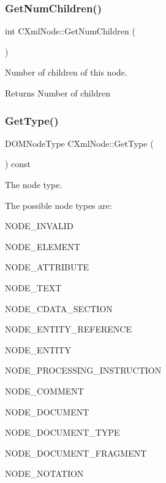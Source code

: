 \subsubsection{\texorpdfstring{Get\+Num\+Children()}{GetNumChildren()}}
{\footnotesize\ttfamily int C\+Xml\+Node\+::\+Get\+Num\+Children (\begin{DoxyParamCaption}{ }\end{DoxyParamCaption})}



Number of children of this node. 

\begin{DoxyReturn}{Returns}
Number of children 
\end{DoxyReturn}
\mbox{\label{classxmlnode_1_1_c_xml_node_ac6a20070f4679d4b7e4e69b844692214}} 
\subsubsection{\texorpdfstring{Get\+Type()}{GetType()}}
{\footnotesize\ttfamily D\+O\+M\+Node\+Type C\+Xml\+Node\+::\+Get\+Type (\begin{DoxyParamCaption}{ }\end{DoxyParamCaption}) const}



The node type. 

The possible node types are\+:
\begin{DoxyItemize}
\item N\+O\+D\+E\+\_\+\+I\+N\+V\+A\+L\+ID
\item N\+O\+D\+E\+\_\+\+E\+L\+E\+M\+E\+NT
\item N\+O\+D\+E\+\_\+\+A\+T\+T\+R\+I\+B\+U\+TE
\item N\+O\+D\+E\+\_\+\+T\+E\+XT
\item N\+O\+D\+E\+\_\+\+C\+D\+A\+T\+A\+\_\+\+S\+E\+C\+T\+I\+ON
\item N\+O\+D\+E\+\_\+\+E\+N\+T\+I\+T\+Y\+\_\+\+R\+E\+F\+E\+R\+E\+N\+CE
\item N\+O\+D\+E\+\_\+\+E\+N\+T\+I\+TY
\item N\+O\+D\+E\+\_\+\+P\+R\+O\+C\+E\+S\+S\+I\+N\+G\+\_\+\+I\+N\+S\+T\+R\+U\+C\+T\+I\+ON
\item N\+O\+D\+E\+\_\+\+C\+O\+M\+M\+E\+NT
\item N\+O\+D\+E\+\_\+\+D\+O\+C\+U\+M\+E\+NT
\item N\+O\+D\+E\+\_\+\+D\+O\+C\+U\+M\+E\+N\+T\+\_\+\+T\+Y\+PE
\item N\+O\+D\+E\+\_\+\+D\+O\+C\+U\+M\+E\+N\+T\+\_\+\+F\+R\+A\+G\+M\+E\+NT
\item N\+O\+D\+E\+\_\+\+N\+O\+T\+A\+T\+I\+ON
\end{DoxyItemize}

